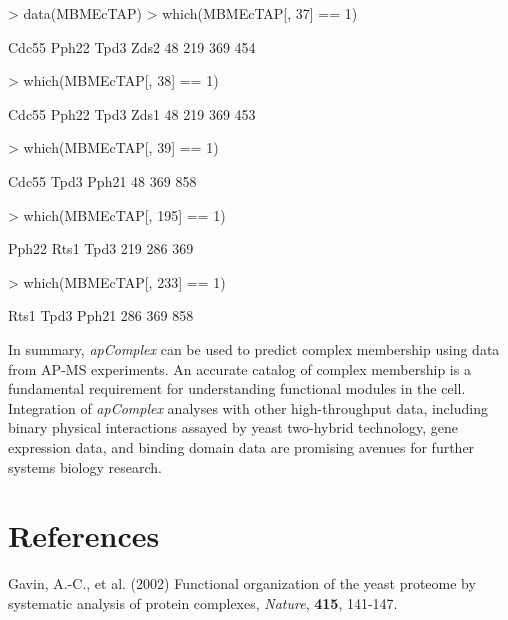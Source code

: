 \documentclass[11pt]{article}
\newcommand{\Rpackage}[1]{{\textit{#1}}}
\begin{document}
\begin{Schunk}
\begin{Sinput}
> data(MBMEcTAP)
> which(MBMEcTAP[, 37] == 1)
\end{Sinput}
\begin{Soutput}
Cdc55 Pph22  Tpd3  Zds2 
   48   219   369   454 
\end{Soutput}
\begin{Sinput}
> which(MBMEcTAP[, 38] == 1)
\end{Sinput}
\begin{Soutput}
Cdc55 Pph22  Tpd3  Zds1 
   48   219   369   453 
\end{Soutput}
\begin{Sinput}
> which(MBMEcTAP[, 39] == 1)
\end{Sinput}
\begin{Soutput}
Cdc55  Tpd3 Pph21 
   48   369   858 
\end{Soutput}
\begin{Sinput}
> which(MBMEcTAP[, 195] == 1)
\end{Sinput}
\begin{Soutput}
Pph22  Rts1  Tpd3 
  219   286   369 
\end{Soutput}
\begin{Sinput}
> which(MBMEcTAP[, 233] == 1)
\end{Sinput}
\begin{Soutput}
 Rts1  Tpd3 Pph21 
  286   369   858 
\end{Soutput}
\end{Schunk}

In summary, \Rpackage{apComplex} can be used to predict complex membership
using data from AP-MS experiments.  An accurate catalog of complex membership
is a fundamental requirement for understanding functional modules in the cell.  Integration of \Rpackage{apComplex} analyses with other
high-throughput data, including binary physical interactions assayed by
yeast two-hybrid technology, gene expression data, and binding domain data
are promising avenues for further systems biology research.

\section*{References}

\noindent Gavin, A.-C., et al. (2002) Functional organization of the yeast
proteome by systematic analysis of protein complexes, \textit{Nature},
\textbf{415}, 141-147.

\vspace{.2in}
\end{document}
